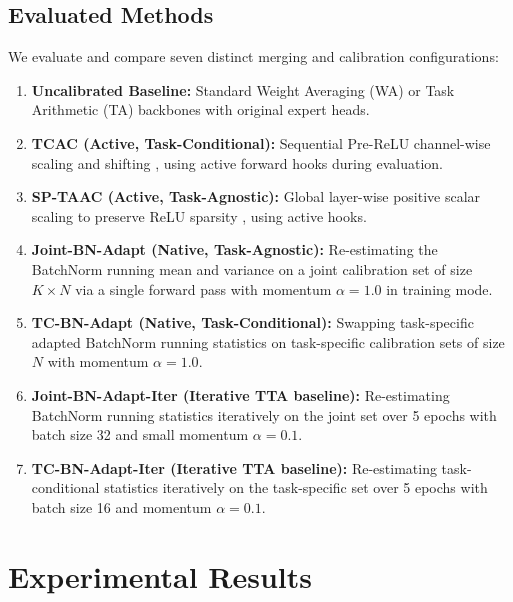 \documentclass{article}
\begin{document}
\subsection{Evaluated Methods}
We evaluate and compare seven distinct merging and calibration configurations:
\begin{enumerate}
    \item \textbf{Uncalibrated Baseline:} Standard Weight Averaging (WA) or Task Arithmetic (TA) backbones with original expert heads.
    \item \textbf{TCAC (Active, Task-Conditional):} Sequential Pre-ReLU channel-wise scaling and shifting \cite{anonymous2026c_tcac}, using active forward hooks during evaluation.
    \item \textbf{SP-TAAC (Active, Task-Agnostic):} Global layer-wise positive scalar scaling to preserve ReLU sparsity \cite{anonymous2026a_sptaac}, using active hooks.
    \item \textbf{Joint-BN-Adapt (Native, Task-Agnostic):} Re-estimating the BatchNorm running mean and variance on a joint calibration set of size $K \times N$ via a single forward pass with momentum $\alpha=1.0$ in training mode.
    \item \textbf{TC-BN-Adapt (Native, Task-Conditional):} Swapping task-specific adapted BatchNorm running statistics on task-specific calibration sets of size $N$ with momentum $\alpha=1.0$.
    \item \textbf{Joint-BN-Adapt-Iter (Iterative TTA baseline):} Re-estimating BatchNorm running statistics iteratively on the joint set over 5 epochs with batch size 32 and small momentum $\alpha=0.1$.
    \item \textbf{TC-BN-Adapt-Iter (Iterative TTA baseline):} Re-estimating task-conditional statistics iteratively on the task-specific set over 5 epochs with batch size 16 and momentum $\alpha=0.1$.
\end{enumerate}

\section{Experimental Results}
\label{sec:results}
\end{document}
